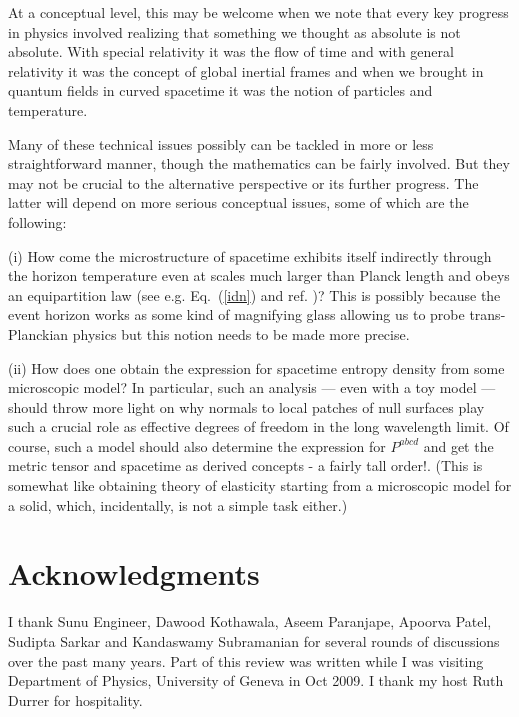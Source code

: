 \documentclass[12pt]{iopart}
\def\eq#1{{Eq.~(\ref{#1})}}
\begin{document}
 
 
 

At a conceptual level, this may be welcome when we note that 
every key progress in physics involved realizing that something we thought as absolute is  not absolute. With special relativity it was the flow of time and with general relativity it was the concept of global inertial frames and when we brought in quantum fields in curved spacetime it was the notion of particles and temperature.

 
 Many of these technical issues possibly  can be tackled in more or less straightforward manner, 
though the mathematics can be fairly involved. But  they may not be crucial to the alternative perspective or its further progress. The latter will depend on more serious conceptual issues, some of which are the following: 

(i) How come the microstructure of spacetime  exhibits itself indirectly through the 
horizon temperature even at scales much larger than Planck length and obeys an equipartition law (see e.g. \eq{idn} and ref. \cite{TPgravcqg04,equipartition})? This is possibly 
because the event horizon works as some kind of magnifying glass allowing us to probe
trans-Planckian physics \cite{Padmanabhan:1998jp,Padmanabhan:1998vr} but this notion needs to be made more precise. 

(ii) How does one obtain the expression for spacetime entropy density from some microscopic model? In particular, such an analysis  --- even with a toy model --- should throw more light on why normals to local patches of null surfaces play such a crucial role as effective degrees of freedom in the long wavelength limit. Of course, such a model
should also determine the expression for $P^{abcd}$ and get the metric tensor and spacetime as derived concepts - a fairly tall order!. (This is somewhat like obtaining theory of elasticity starting from a microscopic model for a solid, which, incidentally, is not a simple task either.)

\section*{Acknowledgments}

I thank
 Sunu Engineer, Dawood Kothawala, Aseem Paranjape,
 Apoorva Patel, Sudipta Sarkar    and    Kandaswamy Subramanian
 for several rounds of discussions over the past many years. 
Part of this review was written while I was visiting Department of Physics, University of Geneva in Oct 2009. I thank my host Ruth Durrer for hospitality. 
\end{document}
